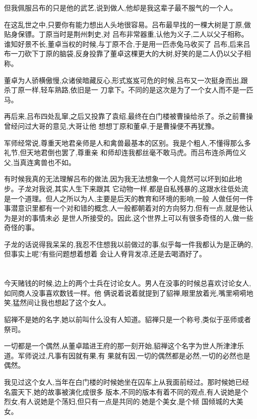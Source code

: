 ﻿\documentclass[12pt,twocolumn]{article}
\begin{document}
但我佩服吕布的只是他的武艺,说到做人,他却是我这辈子最不服气的一个人。

在这乱世之中,只要你有能力想出人头地很容易。吕布最早找的一棵大树是丁原,做贴身保镖。丁原当时是荆州刺史,对
吕布非常器重,认他为义子,二人以父子相称。谁知好景不长,董卓当权的时候,与丁原不合,于是用一匹赤兔马收买了
吕布,后来吕布一刀砍下丁原的脑袋,反身投靠了董卓这棵更大的大树,好笑的是二人仍以父子相称。

董卓为人骄横傲慢,众诸侯暗藏反心,形式岌岌可危的时候,吕布又一次挺身而出,跟杀丁原一样,轻车熟路,依旧是一
刀拿下。不同的是这次是为了一个女人而不是一匹马。

再后来,吕布四处乱窜,之后又投靠了袁绍,最终在白门楼被曹操给杀了。杀之前曹操曾经问过大哥的意见,大哥让他
想想丁原和董卓,于是曹操便不再犹豫。

军师经常说,尊重天地君亲师是人和禽兽最基本的区别。我是个粗人,不懂得那么多礼节,但天地君倒也罢了,尊重亲
和师却连我都丝毫不敢马虎。而吕布连杀两位义父,当真连禽兽也不如。

有时候我真的无法理解吕布的做法,因为我无法想象一个人竟然可以坏到如此地步。子龙对我说,其实人生下来跟其
它动物一样,都是自私残暴的,这跟水往低处流是一个道理。但人之所以为人,主要是后天的教育和环境的影响,一般
人做任何一件事潜意识里都有一个对和错的概念,人一般都朝着对的方向努力,但有一点,就是他认为是对的事情未必
是世人所接受的。因此,这个世界上可以有很多奇怪的人,做一些奇怪的事。

子龙的话说得我呆呆的,我忍不住想我以前做过的事,似乎每一件我都认为是正确的,但事实上呢?有些问题想着想着
会让人脊背发凉,还是去喝酒好了。

\section{}

今天赌钱的时候,边上的两个士兵在讨论女人。男人在没事的时候总喜欢讨论女人,如同商人没事喜欢数钱一样。他
俩说着说着就提到了貂禅,眼里放着光,嘴里嗬嗬地笑,猛然间让我也想起了这个女人。

貂禅不是她的名字,她以前叫什么没有人知道。貂禅只是一个称号,类似于巫师或者祭司。

一切都是一个偶然,从董卓踏进王府的那一刻开始,貂禅这个名字为世人所津津乐道。军师说过,凡事有因就有果,有
果就有因,一切的偶然都是必然,一切的必然也是偶然。

我见过这个女人,当年在白门楼的时候她坐在囚车上从我面前经过。那时候她已经名震天下,她的故事被演化成很多
版本,不同的版本有着不同的观点,有人说她是个烈女,有人说她是个荡妇,但只有一点是共同的:她是个美女,是个倾
国倾城的大美女。
\end{document}
